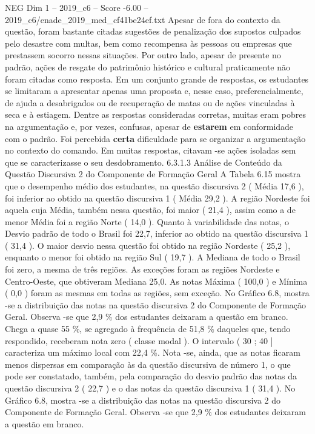 \begin{textsample}{NEG Dim 1 – 2019\_c6 – Score -6.00 – 2019\_c6/enade\_2019\_med\_cf41be24ef.txt}
Apesar de fora do contexto da questão, foram bastante citadas sugestões de penalização dos supostos culpados pelo desastre com multas, bem como recompensa às pessoas ou empresas que prestassem socorro nessas situações.
Por outro lado, apesar de presente no padrão, ações de resgate do patrimônio histórico e cultural praticamente não foram citadas como resposta.
Em um conjunto grande de respostas, os estudantes se limitaram a apresentar apenas uma proposta e, nesse caso, preferencialmente, de ajuda a desabrigados ou de recuperação de matas ou de ações vinculadas à seca e à estiagem.
Dentre as respostas consideradas corretas, muitas eram pobres na argumentação e, por vezes, confusas, apesar de \textbf{estarem} em conformidade com o padrão.
Foi percebida \textbf{certa} dificuldade para se organizar a argumentação no contexto do comando.
Em muitas respostas, citavam -se ações isoladas sem que se caracterizasse o seu desdobramento. 6.3.1.3 Análise de Conteúdo da Questão Discursiva 2 do Componente de Formação Geral A Tabela 6.15 mostra que o desempenho médio dos estudantes, na questão discursiva 2 ( Média 17,6 ), foi inferior ao obtido na questão discursiva 1 ( Média 29,2 ).
A região Nordeste foi aquela cuja Média, também nessa questão, foi maior ( 21,4 ), assim como a de menor Média foi a região Norte ( 14,0 ).
Quanto à variabilidade das notas, o Desvio padrão de todo o Brasil foi 22,7, inferior ao obtido na questão discursiva 1 ( 31,4 ).
O maior desvio nessa questão foi obtido na região Nordeste ( 25,2 ), enquanto o menor foi obtido na região Sul ( 19,7 ).
A Mediana de todo o Brasil foi zero, a mesma de três regiões.
As exceções foram as regiões Nordeste e Centro-Oeste, que obtiveram Mediana 25,0.
As notas Máxima ( 100,0 ) e Mínima ( 0,0 ) foram as mesmas em todas as regiões, sem exceção.
No Gráfico 6.8, mostra -se a distribuição das notas na questão discursiva 2 do Componente de Formação Geral.
Observa -se que 2,9 \% dos estudantes deixaram a questão em branco.
Chega a quase 55 \%, se agregado à frequência de 51,8 \% daqueles que, tendo respondido, receberam nota zero ( classe modal ).
O intervalo ( 30 ; 40 ] caracteriza um máximo local com 22,4 \%.
Nota -se, ainda, que as notas ficaram menos dispersas em comparação às da questão discursiva de número 1, o que pode ser constatado, também, pela comparação do desvio padrão das notas da questão discursiva 2 ( 22,7 ) e o das notas da questão discursiva 1 ( 31,4 ).
No Gráfico 6.8, mostra -se a distribuição das notas na questão discursiva 2 do Componente de Formação Geral.
Observa -se que 2,9 \% dos estudantes deixaram a questão em branco.

\end{textsample}
